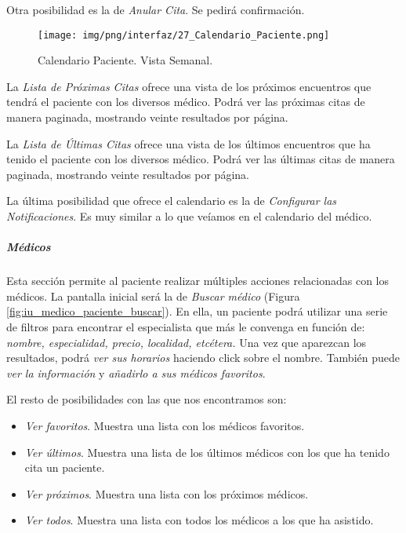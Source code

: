 \documentclass[a4paper,oneside,11pt]{book}
\begin{document}
		Otra posibilidad es la de \textit{Anular Cita}. Se pedirá confirmación.			
		
		
		\begin{figure}[H]
		  \centering
		    \texttt{[image: img/png/interfaz/27\_Calendario\_Paciente.png]}
		  \caption{Calendario Paciente. Vista Semanal.}
		  \label{fig:iu_calendario_vista_semanal_paciente}
		\end{figure}
		
		La \textit{Lista de Próximas Citas} ofrece una vista de los próximos encuentros que tendrá el paciente con los diversos médico. Podrá ver las próximas citas de manera paginada, mostrando veinte resultados por página.	
		
		La \textit{Lista de Últimas Citas} ofrece una vista de los últimos encuentros que ha tenido el paciente con los diversos médico. Podrá ver las últimas citas de manera paginada, mostrando veinte resultados por página.		
		
		La última posibilidad que ofrece el calendario es la de \textit{Configurar las Notificaciones}. Es muy similar a lo que veíamos en el calendario del médico. 	
		
		
		\subparagraph{Médicos} %
		\label{par:paciente_medicos}
		
			Esta sección permite al paciente realizar múltiples acciones relacionadas con los médicos. La pantalla inicial será la de \textit{Buscar médico} (Figura \ref{fig:iu_medico_paciente_buscar}). En ella, un paciente podrá utilizar una serie de filtros para encontrar el especialista que más le convenga en función de: \textit{nombre, especialidad, precio, localidad, etcétera.} Una vez que aparezcan los resultados, podrá \textit{ver sus horarios} haciendo click sobre el nombre. También puede \textit{ver la información} y \textit{añadirlo a sus médicos favoritos}. 
			
			
			El resto de posibilidades con las que nos encontramos son:
			\begin{itemize}
				\item \textit{Ver favoritos}. Muestra una lista con los médicos favoritos.
				\item \textit{Ver últimos}. Muestra una lista de los últimos médicos con los que ha tenido cita un paciente.
				\item \textit{Ver próximos}. Muestra una lista con los próximos médicos.
				\item \textit{Ver todos}. Muestra una lista con todos los médicos a los que ha asistido.
			\end{itemize}
		
\end{document}
